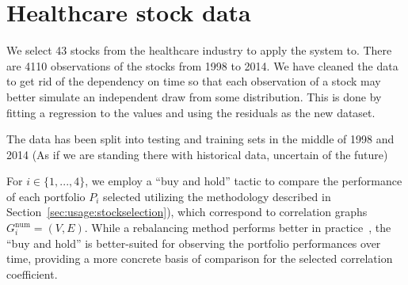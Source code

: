 \section{Healthcare stock data}
\label{sec:usage:data}

We select 43 stocks from the healthcare industry to apply the system to. There 
are 4110 observations of the stocks from 1998 to 2014. We have cleaned the data 
to get rid of the dependency on time so that each observation of a stock may 
better simulate an independent draw from some distribution. This is done by 
fitting a regression to the values and using the residuals as the new dataset.

The data has been split into testing and training sets in the middle of 1998 
and 2014 (As if we are standing there with historical data, uncertain of the 
future)

For $i\in\{1,...,4\}$, 
we employ a ``buy and hold'' tactic to compare the performance of each 
portfolio $P_i$ selected utilizing the methodology described in 
Section~\ref{sec:usage:stockselection}), which correspond to correlation graphs 
$G_i^{\text{num}}=(V,E)$. While a rebalancing method performs better in 
practice~\cite{liuh2016}, the ``buy and hold'' is better-suited for observing 
the portfolio performances over time, providing a more concrete basis of 
comparison for the selected correlation coefficient.